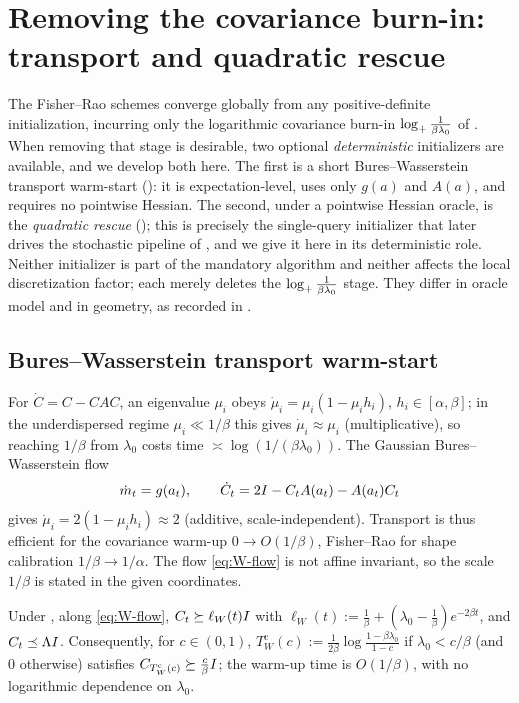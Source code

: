 \section{Removing the covariance burn-in: transport and quadratic rescue}
\label{sec:transport-bootstrap}

The Fisher--Rao schemes converge globally from any positive-definite initialization, incurring only
the logarithmic covariance burn-in $\log_+\tfrac1{\beta\lambda_0}$ of
. When removing that stage is desirable, two
optional \emph{deterministic} initializers are available, and we develop both here. The first is a
short Bures--Wasserstein transport warm-start (): it is
expectation-level, uses only $g(a)$ and $A(a)$, and requires no pointwise Hessian. The second, under
a pointwise Hessian oracle, is the \emph{quadratic rescue} (); this is
precisely the single-query initializer that later drives the stochastic pipeline of
, and we give it here in its deterministic role. Neither initializer is part
of the mandatory algorithm and neither affects the local discretization factor; each merely deletes
the $\log_+\tfrac1{\beta\lambda_0}$ stage. They differ in oracle model and in geometry, as recorded in
.

\subsection{Bures--Wasserstein transport warm-start}
\label{subsec:transport-warmstart}

For $\dot C=C-CAC$, an eigenvalue $\mu_i$ obeys $\dot\mu_i=\mu_i(1-\mu_ih_i)$, $h_i\in[\alpha,\beta]$;
in the underdispersed regime $\mu_i\ll1/\beta$ this gives $\dot\mu_i\approx\mu_i$ (multiplicative),
so reaching $1/\beta$ from $\lambda_0$ costs time $\asymp\log(1/(\beta\lambda_0))$. The Gaussian
Bures--Wasserstein flow
\begin{equation}
\label{eq:W-flow}
    \dot m_t=g(a_t),\qquad \dot C_t=2I-C_tA(a_t)-A(a_t)C_t
\end{equation}
gives $\dot\mu_i=2(1-\mu_ih_i)\approx2$ (additive, scale-independent). Transport is thus efficient
for the covariance warm-up $0\to O(1/\beta)$, Fisher--Rao for shape calibration $1/\beta\to1/\alpha$.
The flow \eqref{eq:W-flow} is not affine invariant, so the scale $1/\beta$ is stated in the given
coordinates.

\begin{lemma}
\label{lem:W-cov-bootstrap}
Under , along \eqref{eq:W-flow},
$C_t\succeq\ell_W(t)I$ with $\ell_W(t):=\tfrac1\beta+(\lambda_0-\tfrac1\beta)e^{-2\beta t}$, and
$C_t\preceq\Lambda I$. Consequently, for $c\in(0,1)$,
$T_W^{\mathrm c}(c):=\tfrac1{2\beta}\log\tfrac{1-\beta\lambda_0}{1-c}$ if $\lambda_0<c/\beta$ (and $0$
otherwise) satisfies $C_{T_W^{\mathrm c}(c)}\succeq\tfrac c\beta I$; the warm-up time is $O(1/\beta)$,
with no logarithmic dependence on $\lambda_0$.
\end{lemma}

